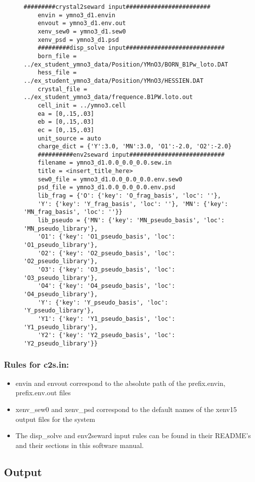 \begin{figure}
	\centering
	\begin{BVerbatim}[fontsize=\small]
	#########crystal2seward input########################
	envin = ymno3_d1.envin
	envout = ymno3_d1.env.out
	xenv_sew0 = ymno3_d1.sew0
	xenv_psd = ymno3_d1.psd
	#########disp_solve input############################
	born_file = ../ex_student_ymno3_data/Position/YMnO3/BORN_B1Pw_loto.DAT
	hess_file = ../ex_student_ymno3_data/Position/YMnO3/HESSIEN.DAT
	crystal_file = ../ex_student_ymno3_data/frequence.B1PW.loto.out
	cell_init = ../ymno3.cell
	ea = [0,.15,.03]
	eb = [0,.15,.03]
	ec = [0,.15,.03]
	unit_source = auto
	charge_dict = {'Y':3.0, 'MN':3.0, 'O1':-2.0, 'O2':-2.0}
	##########env2seward input###########################
	filename = ymno3_d1.0.0_0.0_0.0.sew.in
	title = <insert_title_here>
	sew0_file = ymno3_d1.0.0_0.0_0.0.env.sew0
	psd_file = ymno3_d1.0.0_0.0_0.0.env.psd
	lib_frag = {'O': {'key': 'O_frag_basis', 'loc': ''},
	'Y': {'key': 'Y_frag_basis', 'loc': ''}, 'MN': {'key': 'MN_frag_basis', 'loc': ''}}
	lib_pseudo = {'MN': {'key': 'MN_pseudo_basis', 'loc': 'MN_pseudo_library'},
	'O1': {'key': 'O1_pseudo_basis', 'loc': 'O1_pseudo_library'},
	'O2': {'key': 'O2_pseudo_basis', 'loc': 'O2_pseudo_library'},
	'O3': {'key': 'O3_pseudo_basis', 'loc': 'O3_pseudo_library'},
	'O4': {'key': 'O4_pseudo_basis', 'loc': 'O4_pseudo_library'},
	'Y': {'key': 'Y_pseudo_basis', 'loc': 'Y_pseudo_library'},
	'Y1': {'key': 'Y1_pseudo_basis', 'loc': 'Y1_pseudo_library'},
	'Y2': {'key': 'Y2_pseudo_basis', 'loc': 'Y2_pseudo_library'}}
	\end{BVerbatim}
	\caption{}
\end{figure}

\subsubsection{Rules for c2s.in:}

\begin{itemize}
	\item envin and envout correspond to the absolute path of the prefix.envin, prefix.env.out files
	\item xenv\_sew0 and xenv\_psd correspond to the default names of the xenv15 output files for the system
	\item The disp\_solve and env2seward input rules can be found in their README's and their sections in this software manual.
\end{itemize}

\subsection{Output}

